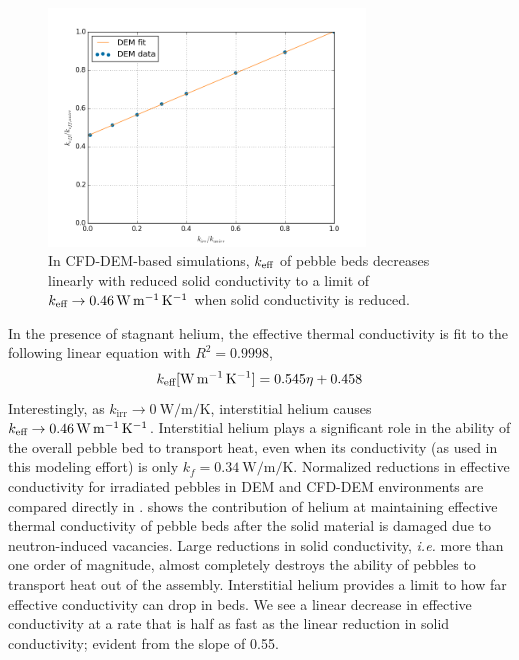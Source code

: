 \begin{figure}[ht]
    \centering
    \includegraphics[width = 0.75\textwidth]{figures/irradiated/keff-plots-cfd-q.png}
    \caption{In CFD-DEM-based simulations, $k_\text{eff}$ of pebble beds decreases linearly with reduced solid conductivity to a limit of $k_\text{eff} \rightarrow \SI{0.46}{\watt\per\meter\per\kelvin}$ when solid conductivity is reduced.}\label{fig:irrad-keff-cfd-q}
\end{figure}
In the presence of stagnant helium, the effective thermal conductivity is fit to the following linear equation with $R^2 = 0.9998$,
\begin{equation}
k_\text{eff} [\si{\watt\per\meter\per\kelvin}] = 0.545 \eta + 0.458
\end{equation}
Interestingly, as $k_\text{irr} \rightarrow \SI{0}{\watt\per\meter\per\kelvin}$, interstitial helium causes $k_\text{eff} \rightarrow \SI{0.46}{\watt\per\meter\per\kelvin}$. Interstitial helium plays a significant role in the ability of the overall pebble bed to transport heat, even when its conductivity (as used in this modeling effort) is only $k_f = \SI{0.34}{\watt\per\meter\per\kelvin}$. Normalized reductions in effective conductivity for irradiated pebbles in DEM and CFD-DEM environments are compared directly in .  shows the contribution of helium at maintaining effective thermal conductivity of pebble beds after the solid material is damaged due to neutron-induced vacancies. Large reductions in solid conductivity, \textit{i.e.} more than one order of magnitude, almost completely destroys the ability of pebbles to transport heat out of the assembly. Interstitial helium provides a limit to how far effective conductivity can drop in beds. We see a linear decrease in effective conductivity at a rate that is half as fast as the linear reduction in solid conductivity; evident from the slope of \num{0.55}.

